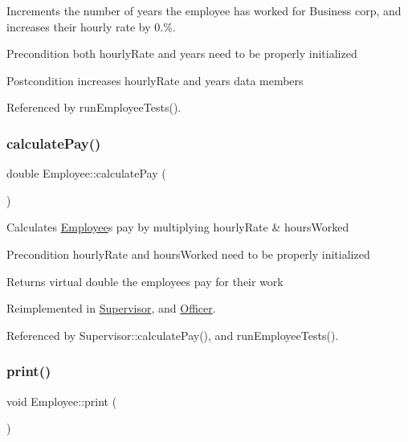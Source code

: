 Increments the number of years the employee has worked for Business corp, and increases their hourly rate by 0.\%.

\begin{DoxyPrecond}{Precondition}
both hourly\+Rate and years need to be properly initialized 
\end{DoxyPrecond}
\begin{DoxyPostcond}{Postcondition}
increases hourly\+Rate and years data members 
\end{DoxyPostcond}


Referenced by run\+Employee\+Tests().

\mbox{\label{classEmployee_a01c2c44e15434237db28832f6972e960}} 
\subsubsection{\texorpdfstring{calculate\+Pay()}{calculatePay()}}
{\footnotesize\ttfamily double Employee\+::calculate\+Pay (\begin{DoxyParamCaption}{ }\end{DoxyParamCaption})\hspace{0.3cm}{\ttfamily [virtual]}}

Calculates \hyperlink{classEmployee}{Employee}\textquotesingle{}s pay by multiplying hourly\+Rate \& hours\+Worked

\begin{DoxyPrecond}{Precondition}
hourly\+Rate and hours\+Worked need to be properly initialized 
\end{DoxyPrecond}
\begin{DoxyReturn}{Returns}
virtual double the employee\textquotesingle{}s pay for their work 
\end{DoxyReturn}


Reimplemented in \hyperlink{classSupervisor_aa37daa89523c08b84ae8141299e036f8}{Supervisor}, and \hyperlink{classOfficer_a1fa1aad39b9e95be7a088990ebf17059}{Officer}.



Referenced by Supervisor\+::calculate\+Pay(), and run\+Employee\+Tests().

\mbox{\label{classEmployee_a79556ad700627dba88049f487a34a762}} 
\subsubsection{\texorpdfstring{print()}{print()}}
{\footnotesize\ttfamily void Employee\+::print (\begin{DoxyParamCaption}{ }\end{DoxyParamCaption})\hspace{0.3cm}{\ttfamily [virtual]}}

